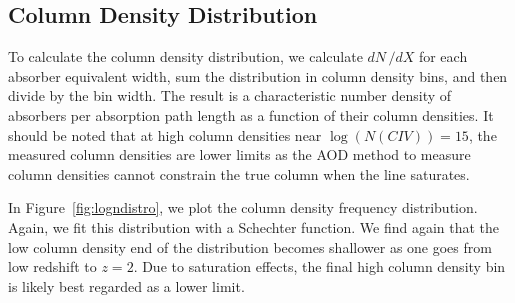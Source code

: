 \documentclass[linenumbers,twocolumn]{aastex61}
\begin{document}
\begin{figure*}[bth]
\caption{The equivalent width distribution of {\CIV} absorbers, defined as the comoving line density ($\frac{dN}{dX}$) in each equivalent width bin divided by the bin width. We fit this distribution with a Schechter function, capturing the self-similar power law behavior of the distribution before the exponential cutoff limiting the size of {\CIV} absorbers.}
\label{fig:ewdistrodndx}
\end{figure*}

\subsection{Column Density Distribution}
\label{sec:logndistro}

To calculate the column density distribution, we calculate $dN\,/dX$ for each absorber equivalent width, sum the distribution in column density bins, and then divide by the bin width. The result is a characteristic number density of {\CIV} absorbers per absorption path length as a function of their column densities. It should be noted that at high column densities near $\log (N(CIV)) = 15$, the measured column densities are lower limits as the AOD method to measure column densities cannot constrain the true column when the line saturates.

In Figure~\ref{fig:logndistro}, we plot the column density frequency distribution. Again, we fit this distribution with a Schechter function. We find again that the low column density end of the distribution becomes shallower as one goes from low redshift to $z = 2$. Due to saturation effects, the final high column density bin is likely best regarded as a lower limit.

\begin{figure*}[bth]
\caption{The column density distribution of ${\CIV}$ absorbers, defined as the comoving line density in each column density bin divided by the bin width. We fit this distribution with a Schechter function.}
\label{fig:logndistrodndz}
\end{figure*}

\begin{figure*}[bth]
\caption{The column density distribution of {\CIV} absorbers, defined as the comoving line density in each column density bin divided by the bin width. We fit this distribution with a Schechter function.}
\label{fig:logndistro}
\end{figure*}
\end{document}
